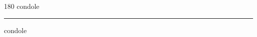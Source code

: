 
\begin{frame}
\begin{center}
\begin{turn}{180}
{\fontsize{2.5cm}{1em}\selectfont condole}
\end{turn}
\vspace{1em}\par  
\hrule
\vspace{1em}\par  
{\fontsize{2.5cm}{1em}\selectfont condole}
\end{center}
\end{frame}
